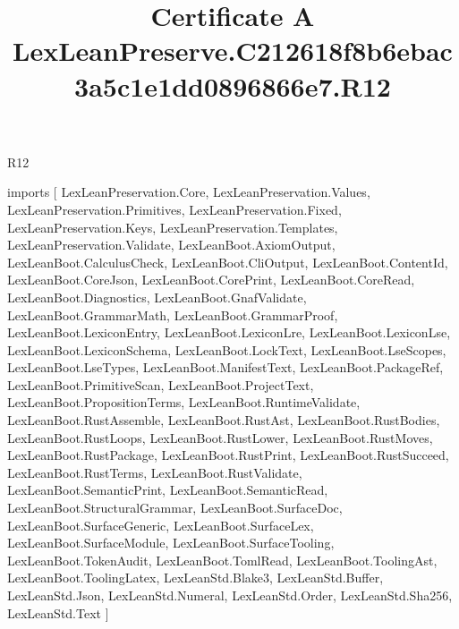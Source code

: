 \begin{lexlean}{R12}
\title{Certificate A LexLeanPreserve.C212618f8b6ebac3a5c1e1dd0896866e7.R12}
\begin{coremodule}
imports [
  LexLeanPreservation.Core,
  LexLeanPreservation.Values,
  LexLeanPreservation.Primitives,
  LexLeanPreservation.Fixed,
  LexLeanPreservation.Keys,
  LexLeanPreservation.Templates,
  LexLeanPreservation.Validate,
  LexLeanBoot.AxiomOutput,
  LexLeanBoot.CalculusCheck,
  LexLeanBoot.CliOutput,
  LexLeanBoot.ContentId,
  LexLeanBoot.CoreJson,
  LexLeanBoot.CorePrint,
  LexLeanBoot.CoreRead,
  LexLeanBoot.Diagnostics,
  LexLeanBoot.GnafValidate,
  LexLeanBoot.GrammarMath,
  LexLeanBoot.GrammarProof,
  LexLeanBoot.LexiconEntry,
  LexLeanBoot.LexiconLre,
  LexLeanBoot.LexiconLse,
  LexLeanBoot.LexiconSchema,
  LexLeanBoot.LockText,
  LexLeanBoot.LseScopes,
  LexLeanBoot.LseTypes,
  LexLeanBoot.ManifestText,
  LexLeanBoot.PackageRef,
  LexLeanBoot.PrimitiveScan,
  LexLeanBoot.ProjectText,
  LexLeanBoot.PropositionTerms,
  LexLeanBoot.RuntimeValidate,
  LexLeanBoot.RustAssemble,
  LexLeanBoot.RustAst,
  LexLeanBoot.RustBodies,
  LexLeanBoot.RustLoops,
  LexLeanBoot.RustLower,
  LexLeanBoot.RustMoves,
  LexLeanBoot.RustPackage,
  LexLeanBoot.RustPrint,
  LexLeanBoot.RustSucceed,
  LexLeanBoot.RustTerms,
  LexLeanBoot.RustValidate,
  LexLeanBoot.SemanticPrint,
  LexLeanBoot.SemanticRead,
  LexLeanBoot.StructuralGrammar,
  LexLeanBoot.SurfaceDoc,
  LexLeanBoot.SurfaceGeneric,
  LexLeanBoot.SurfaceLex,
  LexLeanBoot.SurfaceModule,
  LexLeanBoot.SurfaceTooling,
  LexLeanBoot.TokenAudit,
  LexLeanBoot.TomlRead,
  LexLeanBoot.ToolingAst,
  LexLeanBoot.ToolingLatex,
  LexLeanStd.Blake3,
  LexLeanStd.Buffer,
  LexLeanStd.Json,
  LexLeanStd.Numeral,
  LexLeanStd.Order,
  LexLeanStd.Sha256,
  LexLeanStd.Text
]


\end{coremodule}
\end{lexlean}
